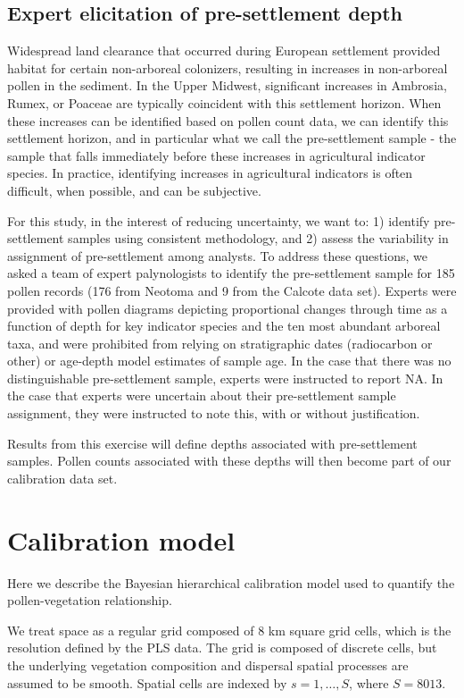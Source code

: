 \documentclass[12pt]{article}
\begin{document}
\subsection{Expert elicitation of pre-settlement depth}
Widespread land clearance that occurred during European settlement
provided habitat for certain non-arboreal colonizers, resulting in
increases in non-arboreal pollen in the sediment. In the Upper
Midwest, significant increases in Ambrosia, Rumex, or Poaceae are
typically coincident with this settlement horizon. When these
increases can be identified based on pollen count data, we can
identify this settlement horizon, and in particular what we call the
pre-settlement sample - the sample that falls immediately before these
increases in agricultural indicator species. In practice, identifying
increases in agricultural indicators is often difficult, when
possible, and can be subjective. 

For this study, in the interest of reducing uncertainty, we want to:
1) identify pre-settlement samples using consistent methodology, and
2) assess the variability in assignment of pre-settlement among
analysts. To address these questions, we asked a team of expert
palynologists to identify the pre-settlement sample for 185 pollen
records (176 from Neotoma and 9 from the Calcote data set). Experts
were provided with pollen diagrams depicting proportional changes
through time as a function of depth for key indicator species and the
ten most abundant arboreal taxa, and were prohibited from relying on
stratigraphic dates (radiocarbon or other) or age-depth model
estimates of sample age. In the case that there was no distinguishable
pre-settlement sample, experts were instructed to report NA. In the
case that experts were uncertain about their pre-settlement sample
assignment, they were instructed to note this, with or without
justification. 

Results from this exercise will define depths associated with
pre-settlement samples. Pollen counts associated with these depths
will then become part of our calibration data set.

\section{Calibration model}

Here we describe the Bayesian hierarchical calibration model used to quantify the
pollen-vegetation relationship. 

We treat space as a regular grid composed of 8 km square grid cells,
which is the resolution defined by the PLS data. The grid is composed
of discrete cells, but the underlying vegetation composition and
dispersal spatial processes are assumed to be smooth. Spatial cells
are indexed by $s=1,\ldots,S$, where $S=8013$.
\end{document}

